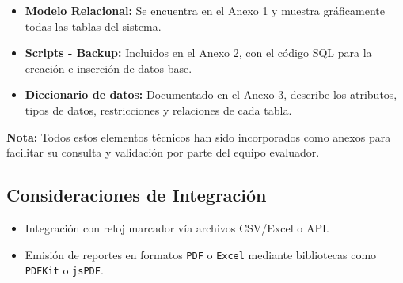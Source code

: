 \begin{itemize}
	\item \textbf{Modelo Relacional:} Se encuentra en el Anexo 1 y muestra gráficamente todas las tablas del sistema.
	\item \textbf{Scripts - Backup:} Incluidos en el Anexo 2, con el código SQL para la creación e inserción de datos base.
	\item \textbf{Diccionario de datos:} Documentado en el Anexo 3, describe los atributos, tipos de datos, restricciones y relaciones de cada tabla.
\end{itemize}

\textbf{Nota:} Todos estos elementos técnicos han sido incorporados como anexos para facilitar su consulta y validación por parte del equipo evaluador.


\subsection{Consideraciones de Integración}

\begin{itemize}
	\item Integración con reloj marcador vía archivos CSV/Excel o API.
	\item Emisión de reportes en formatos \texttt{PDF} o \texttt{Excel} mediante bibliotecas como \texttt{PDFKit} o \texttt{jsPDF}.
\end{itemize}
